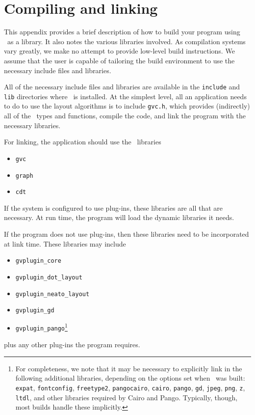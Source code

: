 \section{Compiling and linking}
\label{sec:build}
This appendix provides a brief description of how to build
your program using \gviz\ as a library. It also notes the 
various libraries involved. As compilation systems vary
greatly, we make no attempt to provide low-level build
instructions. We assume that the user is capable of tailoring
the build environment to use the necessary include files and
libraries.

All of the necessary include files and libraries are available
in the {\tt include} and {\tt lib} directories where \gviz\
is installed. At the simplest level, all an application needs
to do to use the layout algorithms is to include {\tt gvc.h},
which provides (indirectly) all of the \gviz\ types and functions,
compile the code,
and link the program with the necessary libraries.

For linking, the application should use the \gviz\ libraries 
\begin{itemize}
\item {\tt gvc}
\item {\tt graph}
\item {\tt cdt}
\end{itemize}
If the system is configured to use plug-ins, these libraries
are all that are necessary. At run time, the program will
load the dynamic libraries it needs.

If the program does not use plug-ins, then these libraries
need to be incorporated at link time. These libraries may
include
\begin{itemize}
\item {\tt gvplugin\_core}
\item {\tt gvplugin\_dot\_layout}
\item {\tt gvplugin\_neato\_layout}
\item {\tt gvplugin\_gd}
\item {\tt gvplugin\_pango}\footnote{
For completeness, we note that it may be necessary to explicitly
link in the following additional libraries, depending
on the options set when \gviz\ was built:
{\tt expat},
{\tt fontconfig},
{\tt freetype2},
{\tt pangocairo},
{\tt cairo},
{\tt pango},
{\tt gd},
{\tt jpeg},
{\tt png},
{\tt z}, 
{\tt ltdl},
and other libraries required by Cairo and Pango.
Typically, though, most builds handle these implicitly.}
\end{itemize}
plus any other plug-ins the program requires.

